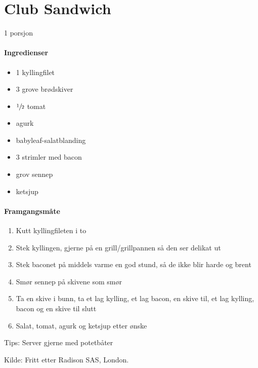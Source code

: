 \section{﻿Club Sandwich}
1 porsjon

\paragraph{Ingredienser}
\begin{itemize}[noitemsep]
	\item 1 kyllingfilet
	\item 3 grove brødskiver
	\item $\sfrac{1}{2}$ tomat
	\item agurk
	\item babyleaf-salatblanding
	\item 3 strimler med bacon
	\item grov sennep
	\item ketsjup
\end{itemize}

\paragraph{Framgangsmåte}
\begin{enumerate}[noitemsep]
	\item Kutt kyllingfileten i to
	\item Stek kyllingen, gjerne på en grill/grillpannen så den ser delikat ut
	\item Stek baconet på middels varme en god stund, så de ikke blir harde og brent
	\item Smør sennep på skivene som smør
	\item Ta en skive i bunn, ta et lag kylling, et lag bacon, en skive til, et lag kylling, bacon og en skive til slutt
	\item Salat, tomat, agurk og ketsjup etter ønske
\end{enumerate}

Tips:
Server gjerne med potetbåter

Kilde: Fritt etter Radison SAS, London.
